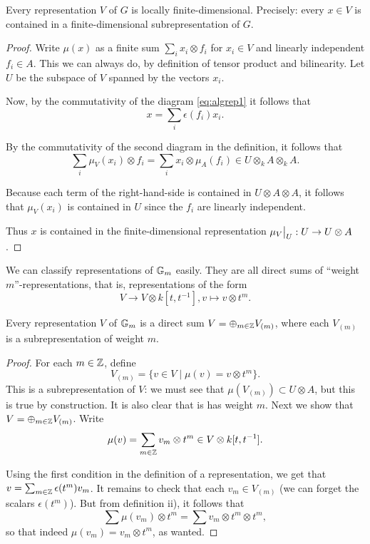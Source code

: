 \documentclass[11pt, english]{article}
\begin{document}
\begin{prop}
\label{propfinite}
Every representation $V$ of $G$ is locally finite-dimensional. Precisely: every $x \in V$ is contained in a finite-dimensional subrepresentation of $G$.
\end{prop}

\begin{proof}
Write $\mu(x)$ as a finite sum $\sum_i x_i \otimes f_i$ for $x_i \in V$ and linearly independent $f_i \in A$. This we can always do, by definition of tensor product and bilinearity. Let $U$ be the subspace of $V$ spanned by the vectors $x_i$.

Now, by the commutativity of the diagram \eqref{eq:algrep1} it follows that $$ x = \sum_i \epsilon(f_i) x_i. $$

By the commutativity of the second diagram in the definition, it follows that
$$
\sum_i \mu_V (x_i) \otimes f_i = \sum_i x_i \otimes \mu_A(f_i) \in U \otimes_k A \otimes_k A.
$$

Because each term of the right-hand-side is contained in $U \otimes A \otimes A$, it follows that $\mu_V(x_i)$ is contained in $U$ since the $f_i$ are linearly independent.

Thus $x$ is contained in the finite-dimensional representation $\restr{\mu_V}{U}:U \to U \otimes A$.
\end{proof}

We can classify representations of $\mathbb{G}_m$ easily. They are all direct sums of ``weight $m$''-representations, that is, representations of the form $$V \to V \otimes k[t, t^{-1}], v \mapsto v \otimes t^m.$$

\begin{prop}
\label{propgm}
 Every representation $V$ of $\mathbb{G}_m$ is a direct sum $V = \oplus_{m \in \mathbb{Z}} V_{(m)}$, where each $V_{(m)}$ is a subrepresentation of weight $m$.
\end{prop}

\begin{proof}
For each $m \in \mathbb{Z}$, define
\[
V_{(m)} = \{ v \in V \mid \mu(v) = v \otimes t^m \}.
\]
This is a subrepresentation of $V$: we must see that $\mu(V_{(m)}) \subset U \otimes A$, but this is true by construction. It is also clear that is has weight $m$. Next we show that $V = \oplus_{m \in \mathbb{Z}} V_{(m)}$. Write
\[
\mu(v) = \sum_{m \in \mathbb{Z}} v_m \otimes t^m \in V \otimes k[t,t^{-1}].
\]

Using the first condition in the definition of a representation, we get that $v = \sum_{m \in \mathbb{Z}} \epsilon(t^m)v_m$. It remains to check that each $v_m \in V_{(m)}$ (we can forget the scalars $\epsilon(t^m)$). But from definition ii), it follows that
\[
\sum \mu(v_m) \otimes t^m = \sum v_m \otimes t^m \otimes t^m,
\]
so that indeed $\mu(v_m)= v_m \otimes t^m$, as wanted.
\end{proof}
\end{document}
